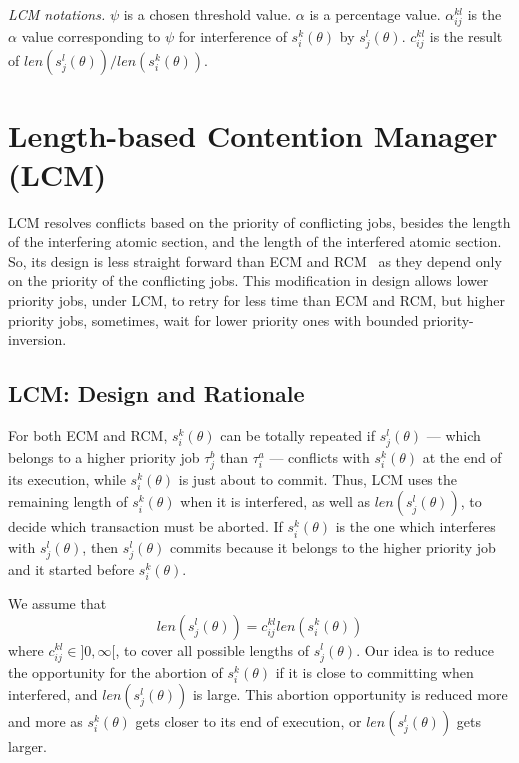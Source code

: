 \documentclass[conference]{IEEEtran}
\begin{document}
\textit{LCM notations.} $\psi$ is a chosen threshold value. $\alpha$ is a percentage value. $\alpha_{ij}^{kl}$ is the $\alpha$ value corresponding to $\psi$ for interference of $s_i^k(\theta)$ by $s_j^l(\theta)$. $c_{ij}^{kl}$ is the result of $len(s_j^l(\theta))/len(s_i^k(\theta))$.

\section{Length-based Contention Manager (LCM)}

LCM resolves conflicts based on the priority of conflicting jobs, besides the length of the interfering atomic section, and the length of the interfered atomic section. So, its design is less straight forward than ECM and RCM~\cite{stmconcurrencycontrol:emsoft11} as they depend only on the priority of the conflicting jobs. This modification in design allows lower priority jobs, under LCM, to retry for less time than ECM and RCM, but higher priority jobs, sometimes, wait for lower priority ones with bounded priority-inversion.

\subsection{\label{sec 9.1} LCM: Design and Rationale}

For both ECM and RCM, $s_{i}^{k}(\theta)$ can be totally repeated if $s_{j}^{l}(\theta)$ --- which belongs to a higher priority job $\tau_{j}^b$ than $\tau_{i}^a$ --- conflicts with $s_{i}^{k}(\theta)$
at the end of its execution, while $s_{i}^{k}(\theta)$ is just about
to commit. Thus, LCM  uses the remaining length of $s_{i}^{k}(\theta)$ when it is interfered,
as well as $len(s_{j}^{l}(\theta))$, to decide which transaction must be aborted. If $s_i^k (\theta)$ is the one which interferes with $s_j^l (\theta)$, then $s_j^l (\theta)$ commits because it belongs to the higher priority job and it started before $s_i^k (\theta)$.

We assume that 
\begin{equation}
len(s_{j}^{l}(\theta))=c_{ij}^{kl}len(s_{i}^{k}(\theta))
\label{cm_eq}\end{equation}
where $c_{ij}^{kl}\in]0,\infty[$, to cover all possible lengths of $s_{j}^{l}(\theta)$.
Our idea is to reduce the opportunity for the abortion of $s_{i}^{k}(\theta)$ if it is close to committing when interfered, and $len(s_{j}^{l}(\theta))$ is large. This abortion opportunity is reduced more and more as $s_{i}^{k}(\theta)$ gets closer to its end of execution, or $len(s_{j}^{l}(\theta))$ gets larger. 
\end{document}
